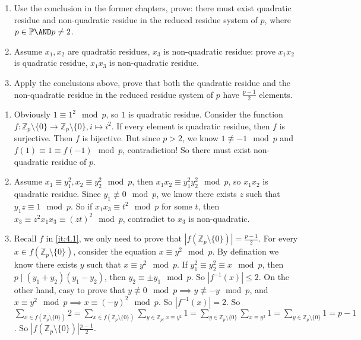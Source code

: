 \documentclass{ctexart}
\begin{document}
\begin{problem}\label{pro:4}
  \begin{enumerate}
    \item Use the conclusion in the former chapters, prove:
      there must exist quadratic residue and
      non-quadratic residue in the reduced residue system of \(p\), where \(p \in \mathbb{P} \AND p \neq 2\).
    \item Assume \(x_1,x_2\) are quadratic residues, \(x_3\) is non-quadratic residue:
      prove \(x_1x_2\) is quadratic residue, \(x_1x_3\) is non-quadratic residue.
    \item Apply the conclusions above, prove that both the quadratic residue and the non-quadratic residue
      in the reduced residue system of \(p\) have
      \(\frac{p-1}{2}\) elements.
  \end{enumerate}
\end{problem}
\begin{solution}
  \begin{enumerate}
    \item \label{it:4.1}Obviously \(1 \equiv 1^2 \mod p\), so \(1\) is quadratic residue.
      Consider the function \(f:\mathbb{Z}_p\setminus\{0\} \to \mathbb{Z}_p\setminus\{0\},i \mapsto i^2\).
      If every element is quadratic residue, then \(f\) is surjective. Then \(f\) is bijective.
      But since \(p>2\), we know \(1 \not \equiv -1 \mod p\) and \(f(1)\equiv 1 \equiv f(-1)\mod p\), contradiction!
      So there must exist non-quadratic residue of \(p\).
    \item Assume \(x_1 \equiv y_1^2,x_2 \equiv y_2^2 \mod p\), then \(x_1 x_2 \equiv y_1^2 y_2^2 \mod p\), so \(x_1 x_2\) is quadratic residue.
      Since \(y_1 \not \equiv 0 \mod p\), we know there exists \(z\) such that \(y_1 z \equiv 1 \mod p\).
      So if \(x_1 x_3 \equiv t^2 \mod p\) for some \(t\), then \(x_3 \equiv z^2 x_1 x_3 \equiv (zt)^2 \mod p\), contradict to \(x_3\) is non-quadratic.
    \item Recall \(f\) in \ref{it:4.1}, we only need to prove that \(|f(\mathbb{Z}_p\setminus\{0\})|=\frac{p-1}{2}\).
      For every \(x \in f(\mathbb{Z}_p\setminus\{0\})\), consider the equation \(x \equiv y^2 \mod p\).
      By defination we know there exists \(y\) such that \(x \equiv y^2 \mod p\).
      If \(y_1^2 \equiv y_2^2 \equiv x \mod p\), then \(p \mid (y_1+y_2)(y_1-y_2)\), then \(y_2 \equiv \pm y_1 \mod p\).
      So \(|f^{-1}(x)|\leq 2\).
      On the other hand, easy to prove that \(y \not \equiv 0 \mod p \implies y \not \equiv -y \mod p\), and \(x \equiv y^2 \mod p \implies x \equiv (-y)^2 \mod p\).
      So \(|f^{-1}(x)|=2\).
      So \(\sum_{x \in f(\mathbb{Z}_p\setminus\{0\})} 2=\sum_{x \in f(\mathbb{Z}_p\setminus\{0\})} \sum_{y \in \mathbb{Z}_p,x \equiv y^2}1=\sum_{y \in \mathbb{Z}_p\setminus\{0\}} \sum_{x \equiv y^2}1 =\sum_{y \in \mathbb{Z}_p\setminus\{0\}}1=p-1\).
      So \(|f(\mathbb{Z}_p\setminus\{0\})|\frac{p-1}{2}\).
  \end{enumerate}

\end{solution}
\end{document}

